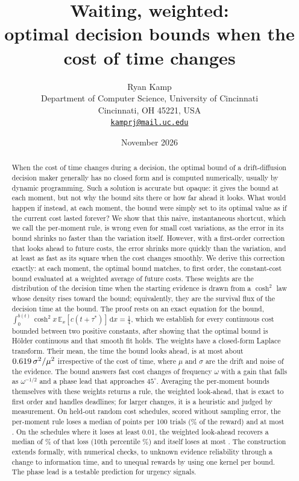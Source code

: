 \documentclass[11pt]{article}
\title{Waiting, weighted:\\ optimal decision bounds when the cost of time changes}
\author{Ryan Kamp\\[0.5ex]
  {\small Department of Computer Science, University of Cincinnati}\\
  {\small Cincinnati, OH 45221, USA}\\
  {\small\href{mailto:kamprj@mail.uc.edu}{\nolinkurl{kamprj@mail.uc.edu}}}}
\date{November 2026}
\theoremstyle{definition}
\theoremstyle{remark}
\newcommand{\E}{\mathbb{E}}
\newcommand{\dd}{\,\mathrm{d}}
\begin{document}
\maketitle

\begin{abstract}
When the cost of time changes during a decision, the optimal bound of a drift-diffusion decision
maker generally has no closed form and is computed numerically, usually by dynamic programming. Such
a solution is accurate but opaque: it gives the bound at each moment, but not why the bound sits
there or how far ahead it looks. What would happen if instead, at each moment, the bound were simply
set to its optimal value as if the current cost lasted forever? We show that this naive,
instantaneous shortcut, which we call the per-moment rule, is wrong even for small cost variations,
as the error in its bound shrinks no faster than the variation itself. However, with a first-order
correction that looks ahead to future costs, the error shrinks more quickly than the variation, and
at least as fast as its square when the cost changes smoothly. We derive this correction exactly: at
each moment, the optimal bound matches, to first order, the constant-cost bound evaluated at a
weighted average of future costs. These weights are the distribution of the decision time when the
starting evidence is drawn from a $\cosh^2$ law whose density rises toward the bound; equivalently,
they are the survival flux of the decision time at the bound. The proof rests on an exact equation
for the bound, $\int_0^{b(t)}\cosh^2 x\, \E_x[c(t+\tau^*)]\dd x = \tfrac14$, which we establish for
every continuous cost bounded between two positive constants, after showing that the optimal bound
is Hölder continuous and that smooth fit holds. The weights have a closed-form Laplace transform.
Their mean, the time the bound looks ahead, is at most about $0.619\,\sigma^2/\mu^2$
irrespective of the cost of time, where $\mu$ and $\sigma$ are the drift and noise of the evidence.
The bound answers fast cost changes of frequency $\omega$ with a gain that falls as $\omega^{-1/2}$
and a phase lead that approaches $45^\circ$. Averaging the per-moment bounds themselves with these
weights returns a rule, the weighted look-ahead, that is exact to first order and handles deadlines;
for larger changes, it is a heuristic and judged by measurement. On \HeldCount{} held-out random
cost schedules, scored without sampling error, the per-moment rule loses a median of
\HeldPerMomentMedian{} points per 100 trials (\HeldShareMedian\% of the reward) and at most
\HeldPerMomentMax. On the \HeldRecoveredCount{} schedules where it loses at least 0.01, the weighted
look-ahead recovers a median of \HeldRecoveredMedian\% of that loss (10th percentile
\HeldRecoveredPTen\%) and itself loses at most \HeldWeightedMax. The construction extends formally,
with numerical checks, to unknown evidence reliability through a change to information time, and to
unequal rewards by using one kernel per bound. The phase lead is a testable prediction for urgency
signals.
\end{abstract}
\end{document}
